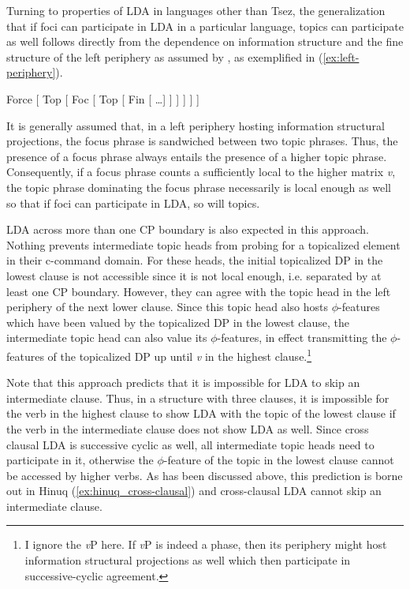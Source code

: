 \documentclass[output=paper
,modfonts
,nonflat]{langsci/langscibook}
\begin{document}
Turning to properties of LDA in languages other than Tsez, the generalization that if foci can participate in LDA in a particular language, topics can participate as well follows directly from the dependence on information structure and the fine structure of the left periphery as assumed by \citet{Rizzi1997}, as exemplified in (\ref{ex:left-periphery}).
\begin{exe} \label{ex:left-periphery}
	\ex {[} Force [ Top [ Foc [ Top [ Fin [ \ldots ] ] ] ] ] ] 
\end{exe}
It is generally assumed that, in a left periphery hosting information structural projections, the focus phrase is sandwiched between two topic phrases. Thus, the presence of a focus phrase always entails the presence of a higher topic phrase. Consequently, if a focus phrase counts a sufficiently local to the higher matrix \textit{v}, the  topic phrase dominating the focus phrase necessarily is local enough as well so that if foci can participate in LDA, so will topics.

LDA across more than one CP boundary is also expected in this approach. Nothing prevents intermediate topic heads from probing for a topicalized element in their c-command domain. For these heads, the initial topicalized DP in the lowest clause is not accessible since it is not local enough, i.e. separated by at least one CP boundary. However, they can agree with the topic head in the left periphery of the next lower clause. Since this topic head also hosts $ \phi $-features which have been valued by the topicalized DP in the lowest clause, the intermediate topic head can also value its $ \phi $-features, in effect transmitting the $ \phi $-features of the topicalized DP up until \textit{v} in the highest clause.\footnote{I ignore the \textit{v}P here. If \textit{v}P is indeed a phase, then its periphery might host information structural projections as well which then participate in successive-cyclic agreement.}

Note that this approach predicts that it is impossible for LDA to skip an intermediate clause. Thus, in a structure with three clauses, it is impossible for the verb in the highest clause to show LDA with the topic of the lowest clause if the verb in the intermediate clause does not show LDA as well. Since cross clausal LDA is successive cyclic as well, all intermediate topic heads need to participate in it, otherwise the $ \phi $-feature of the topic in the lowest clause cannot be accessed by higher verbs. As has been discussed above, this prediction is borne out in Hinuq (\ref{ex:hinuq_cross-clausal}) and cross-clausal LDA cannot skip an intermediate clause.
\end{document}
